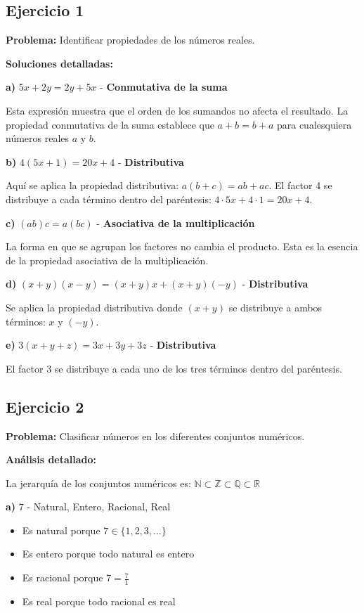 
\subsection*{Ejercicio 1}

\textbf{Problema:} Identificar propiedades de los números reales.

\textbf{Soluciones detalladas:}

\textbf{a)} $5x + 2y = 2y + 5x$ - \textbf{Conmutativa de la suma}

Esta expresión muestra que el orden de los sumandos no afecta el resultado. La propiedad conmutativa de la suma establece que $a + b = b + a$ para cualesquiera números reales $a$ y $b$.

\textbf{b)} $4(5x + 1) = 20x + 4$ - \textbf{Distributiva}

Aquí se aplica la propiedad distributiva: $a(b + c) = ab + ac$. El factor 4 se distribuye a cada término dentro del paréntesis: $4 \cdot 5x + 4 \cdot 1 = 20x + 4$.

\textbf{c)} $(ab)c = a(bc)$ - \textbf{Asociativa de la multiplicación}

La forma en que se agrupan los factores no cambia el producto. Esta es la esencia de la propiedad asociativa de la multiplicación.

\textbf{d)} $(x + y)(x-y) = (x+y)x + (x+y)(-y)$ - \textbf{Distributiva}

Se aplica la propiedad distributiva donde $(x+y)$ se distribuye a ambos términos: $x$ y $(-y)$.

\textbf{e)} $3(x + y + z) = 3x + 3y + 3z$ - \textbf{Distributiva}

El factor 3 se distribuye a cada uno de los tres términos dentro del paréntesis.

\subsection*{Ejercicio 2}

\textbf{Problema:} Clasificar números en los diferentes conjuntos numéricos.

\textbf{Análisis detallado:}

La jerarquía de los conjuntos numéricos es: $\mathbb{N} \subset \mathbb{Z} \subset \mathbb{Q} \subset \mathbb{R}$

\textbf{a)} $7$ - Natural, Entero, Racional, Real
\begin{itemize}
    \item Es natural porque $7 \in \{1, 2, 3, \ldots\}$
    \item Es entero porque todo natural es entero
    \item Es racional porque $7 = \frac{7}{1}$
    \item Es real porque todo racional es real
\end{itemize}

